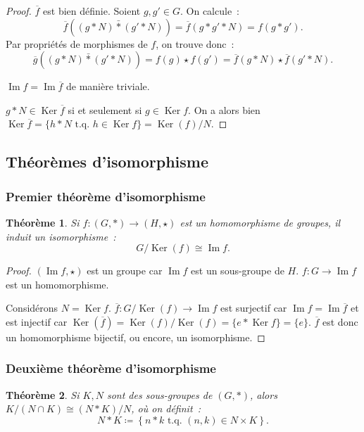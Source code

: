 \documentclass{article}
\newtheorem{thm}{Théorème}[section]
\theoremstyle{definition}
\theoremstyle{remark}
\DeclareMathOperator{\Imf}{Im}
\DeclareMathOperator{\Ker}{Ker}
\newcommand{\tq}{\text{ t.q. }}
\newcommand{\simeqq}{\cong}
\begin{document}
		\begin{proof} $\overline f$ est bien définie. Soient $g, g' \in G$. On calcule~:
		\[\overline f((g*N) \bar * (g'*N)) = \overline f(g*g'*N) = f(g*g').\]
		Par propriétés de morphismes de $f$, on trouve donc~:
		\[\overline g((g*N)\bar *(g'*N)) = f(g) \star f(g') = \overline f(g*N) \star \overline f(g'*N).\]

		$\Imf f = \Imf \overline f$ de manière triviale.

		$g*N \in \Ker \overline f$ si et seulement si $g \in \Ker f$. On a alors bien $\Ker \overline f = \{h*N \tq h \in \Ker f\} = \Ker(f)/N$.
		\end{proof}

	\subsection{Théorèmes d'isomorphisme}
		\subsubsection{Premier théorème d'isomorphisme}
			\begin{thm} Si $f : (G, *) \to (H, \star)$ est un homomorphisme de groupes, il induit un isomorphisme~:
			\[G/\Ker(f) \simeqq \Imf f.\]
			\end{thm}

			\begin{proof} $(\Imf f, \star)$ est un groupe car $\Imf f$ est un sous-groupe de $H$. $f : G \to \Imf f$ est un homomorphisme.

			Considérons $N = \Ker f$. $\overline f : G/\Ker(f) \to \Imf f$ est surjectif car $\Imf f = \Imf \overline f$ et est injectif car
			$\Ker(\overline f) = \Ker(f)/\Ker(f) = \{e * \Ker f\} = \{e\}$. $\overline f$ est donc un homomorphisme bijectif, ou encore, un isomorphisme.
			\end{proof}

		\subsubsection{Deuxième théorème d'isomorphisme}
			\begin{thm} Si $K, N$ sont des sous-groupes de $(G, *)$, alors $K/(N \cap K) \simeqq (N*K)/N$, où on définit~:
			\[N*K \coloneqq \left\{n*k \tq (n, k) \in N \times K\right\}.\]
			\end{thm}
\end{document}
